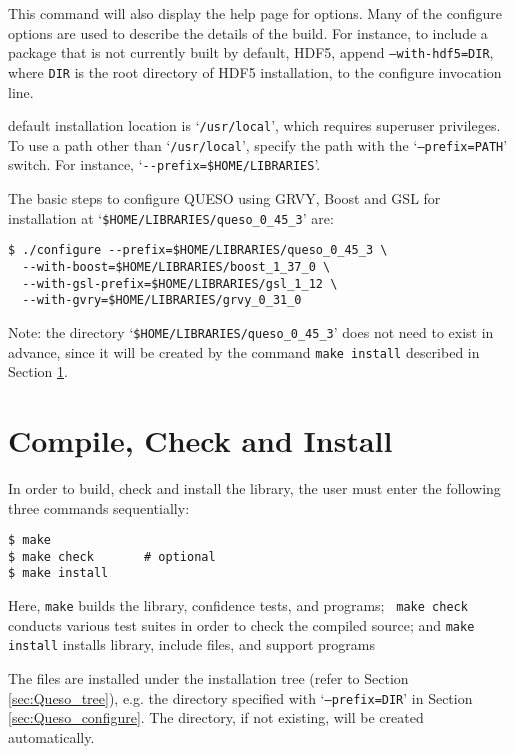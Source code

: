 This command will also display the help page for \Queso{} options.  Many of the \Queso{} configure options are used to describe the details of the build. For instance, to include a package that is not currently built by default, HDF5, append \texttt{--with-hdf5=DIR}, where \texttt{DIR} is the root directory of HDF5 installation,  to the configure invocation line. 

\Queso{} default installation location is `\texttt{/usr/local}', which requires superuser privileges. To use a path
        other than `\texttt{/usr/local}', specify the path with the `\texttt{--prefix=PATH}' switch. For instance, `\verb+--prefix=$HOME/LIBRARIES+'.



The basic steps to configure QUESO using GRVY, Boost and GSL for installation at `\verb+$HOME/LIBRARIES/queso_0_45_3+' are:
\begin{lstlisting}
$ ./configure --prefix=$HOME/LIBRARIES/queso_0_45_3 \
  --with-boost=$HOME/LIBRARIES/boost_1_37_0 \
  --with-gsl-prefix=$HOME/LIBRARIES/gsl_1_12 \
  --with-gvry=$HOME/LIBRARIES/grvy_0_31_0
\end{lstlisting}

Note: the directory `\verb+$HOME/LIBRARIES/queso_0_45_3+' does not need to exist in advance, since it will be created by the command \verb+make install+ described in Section \ref{sec:install_Queso_make}.


\section{Compile, Check and Install \Queso{}}\label{sec:install_Queso_make}
%
In order to build, check and install the library, the user must enter the following three commands sequentially:
\begin{lstlisting}
$ make
$ make check       # optional
$ make install 
\end{lstlisting}

Here, \verb+make+ builds the library, confidence tests, and programs;  \verb+ make check+ conducts various test suites in order to check the compiled source; and \verb+make install+ installs \Queso{} library, include files, and support programs

The files are installed under the installation tree (refer to Section \ref{sec:Queso_tree}), e.g. the directory specified with `\texttt{--prefix=DIR}' in Section \ref{sec:Queso_configure}. The directory, if not existing, will be created automatically.%

